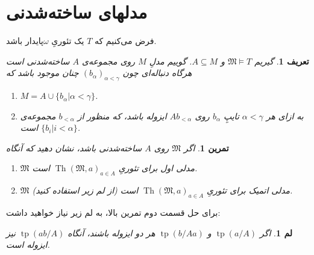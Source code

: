 \documentclass[12pt,a4paper]{report}
\theoremstyle{colorhead}
\newtheorem{tam}{تمرین}
\newtheorem{defn}[thm]{تعریف}
\newtheorem{lem}[thm]{لم}
\DeclareMathOperator{\Th}{Th}
\DeclareMathOperator{\tp}{tp}
\begin{document}
\section{مدلهای ساخته‌شدنی}
فرض می‌کنیم که 
$T$
یک تئوریِ
$\omega$پایدار
باشد.
\begin{defn}
	گیریم
	$\mathfrak{M}\models T$
	و
	$A\subseteq M$.
	گوییم
	مدلِ
	$M$
	روی مجموعه‌ی
	$A$
	ساخته‌شدنی 
	است هرگاه دنباله‌ای چون
	$(b_\alpha)_{\alpha<\gamma}$
	چنان موجود باشد که
	\begin{enumerate}
		\item 
		$M=A\cup \{b_\alpha|\alpha<\gamma\}$.
		\item 
		به ازای هر
		$\alpha<\gamma$
		تایپِ
		$b_\alpha$
		روی
		$Ab_{<\alpha}$
		ایزوله باشد، که منظور از
	$b_{<\alpha}$
	مجموعه‌ی
		\mbox{$\{b_i|i<\alpha\}$}
	است. 
	\end{enumerate}
	\end{defn}
\begin{tam}
اگر
$\mathfrak{M}$
روی
$A$
ساخته‌شدنی باشد، نشان دهید که آنگاه 
\begin{enumerate}
\item 
$\mathfrak{M}$
مدلی اول برای تئوریِ
$\Th(\mathfrak{M},a)_{a\in A}$
است.
\item 
$\mathfrak{M}$
مدلی اتمیک برای تئوریِ
$\Th(\mathfrak{M},a)_{a\in A}$
است (از لم زیر استفاده کنید).
\end{enumerate}
\end{tam}
برای حل قسمت دوم تمرین بالا، به لم زیر نیاز خواهید داشت:
\begin{lem}
اگر
$\tp(a/A)$
و
$\tp(b/Aa)$
هر دو ایزوله باشند، آنگاه
$\tp(ab/A)$
نیز ایزوله است. 
\end{lem}
\end{document}
